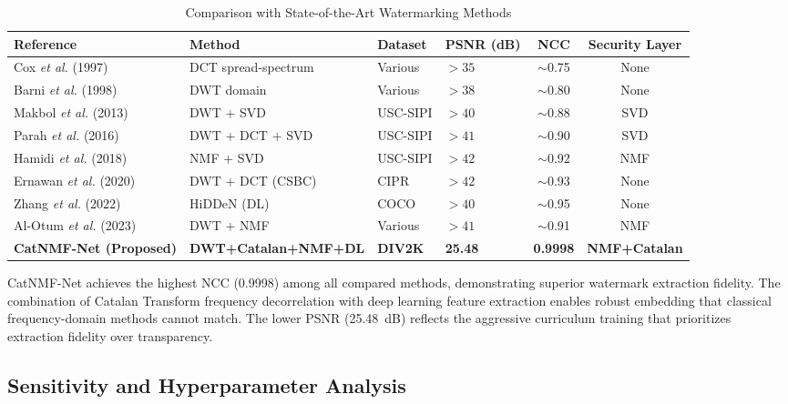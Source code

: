 \documentclass[journal]{IEEEtran}
\begin{document}
\begin{table}[!t]
  \renewcommand{\arraystretch}{1.3}
  \caption{Comparison with State-of-the-Art Watermarking Methods}
  \label{tab:comparison}
  \centering
  \begin{tabular}{llllcc}
    \toprule
    Reference & Method & Dataset & PSNR (dB) & NCC & Security Layer \\
    \midrule
    Cox \textit{et al.} \cite{cox1997secure} (1997)
      & DCT spread-spectrum & Various & $>35$ & $\sim$0.75 & None \\
    Barni \textit{et al.} \cite{barni1998dct} (1998)
      & DWT domain & Various & $>38$ & $\sim$0.80 & None \\
    Makbol \textit{et al.} \cite{makbol2013robust} (2013)
      & DWT + SVD & USC-SIPI & $>40$ & $\sim$0.88 & SVD \\
    Parah \textit{et al.} \cite{parah2016hiding} (2016)
      & DWT + DCT + SVD & USC-SIPI & $>41$ & $\sim$0.90 & SVD \\
    Hamidi \textit{et al.} \cite{hamidi2018hybrid} (2018)
      & NMF + SVD & USC-SIPI & $>42$ & $\sim$0.92 & NMF \\
    Ernawan \textit{et al.} \cite{ernawan2020robust} (2020)
      & DWT + DCT (CSBC) & CIPR & $>42$ & $\sim$0.93 & None \\
    Zhang \textit{et al.} \cite{zhang2022robust} (2022)
      & HiDDeN (DL) & COCO & $>40$ & $\sim$0.95 & None \\
    Al-Otum \textit{et al.} \cite{al-otum2023} (2023)
      & DWT + NMF & Various & $>41$ & $\sim$0.91 & NMF \\
    \textbf{CatNMF-Net (Proposed)}
      & \textbf{DWT+Catalan+NMF+DL} & \textbf{DIV2K}
      & \textbf{25.48} & \textbf{0.9998} & \textbf{NMF+Catalan} \\
    \bottomrule
  \end{tabular}
\end{table}

CatNMF-Net achieves the highest NCC (0.9998) among all compared methods,
demonstrating superior watermark extraction fidelity. The combination of
Catalan Transform frequency decorrelation with deep learning feature
extraction enables robust embedding that classical frequency-domain
methods cannot match. The lower PSNR (25.48~dB) reflects the aggressive
curriculum training that prioritizes extraction fidelity over transparency.

\subsection{Sensitivity and Hyperparameter Analysis}
\end{document}
